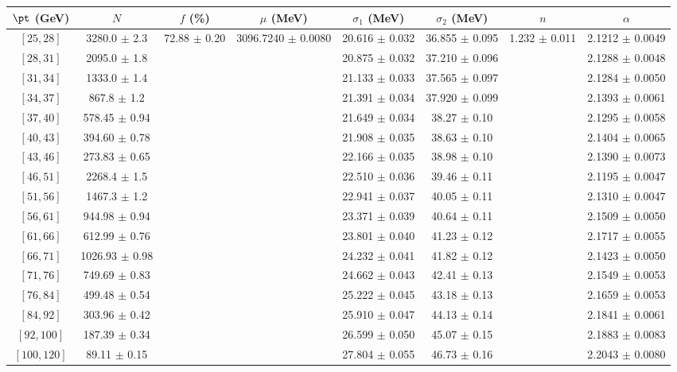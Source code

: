 \begin{tabular}{c||c|c|c|c|c|c|c}
$\pt$ (GeV) & $N$ & $f$ (\%) & $\mu$ (MeV) & $\sigma_1$ (MeV) & $\sigma_2$ (MeV) & $n$ & $\alpha$ \\
\hline
$[25, 28]$ & 3280.0 $\pm$ 2.3 & \multirow{17}{*}{72.88 $\pm$ 0.20} & \multirow{17}{*}{3096.7240 $\pm$ 0.0080} & 20.616 $\pm$ 0.032 & 36.855 $\pm$ 0.095 & \multirow{17}{*}{1.232 $\pm$ 0.011} & 2.1212 $\pm$ 0.0049\\
$[28, 31]$ & 2095.0 $\pm$ 1.8 &  &  & 20.875 $\pm$ 0.032 & 37.210 $\pm$ 0.096 &  & 2.1288 $\pm$ 0.0048\\
$[31, 34]$ & 1333.0 $\pm$ 1.4 &  &  & 21.133 $\pm$ 0.033 & 37.565 $\pm$ 0.097 &  & 2.1284 $\pm$ 0.0050\\
$[34, 37]$ & 867.8 $\pm$ 1.2 &  &  & 21.391 $\pm$ 0.034 & 37.920 $\pm$ 0.099 &  & 2.1393 $\pm$ 0.0061\\
$[37, 40]$ & 578.45 $\pm$ 0.94 &  &  & 21.649 $\pm$ 0.034 & 38.27 $\pm$ 0.10 &  & 2.1295 $\pm$ 0.0058\\
$[40, 43]$ & 394.60 $\pm$ 0.78 &  &  & 21.908 $\pm$ 0.035 & 38.63 $\pm$ 0.10 &  & 2.1404 $\pm$ 0.0065\\
$[43, 46]$ & 273.83 $\pm$ 0.65 &  &  & 22.166 $\pm$ 0.035 & 38.98 $\pm$ 0.10 &  & 2.1390 $\pm$ 0.0073\\
$[46, 51]$ & 2268.4 $\pm$ 1.5 &  &  & 22.510 $\pm$ 0.036 & 39.46 $\pm$ 0.11 &  & 2.1195 $\pm$ 0.0047\\
$[51, 56]$ & 1467.3 $\pm$ 1.2 &  &  & 22.941 $\pm$ 0.037 & 40.05 $\pm$ 0.11 &  & 2.1310 $\pm$ 0.0047\\
$[56, 61]$ & 944.98 $\pm$ 0.94 &  &  & 23.371 $\pm$ 0.039 & 40.64 $\pm$ 0.11 &  & 2.1509 $\pm$ 0.0050\\
$[61, 66]$ & 612.99 $\pm$ 0.76 &  &  & 23.801 $\pm$ 0.040 & 41.23 $\pm$ 0.12 &  & 2.1717 $\pm$ 0.0055\\
$[66, 71]$ & 1026.93 $\pm$ 0.98 &  &  & 24.232 $\pm$ 0.041 & 41.82 $\pm$ 0.12 &  & 2.1423 $\pm$ 0.0050\\
$[71, 76]$ & 749.69 $\pm$ 0.83 &  &  & 24.662 $\pm$ 0.043 & 42.41 $\pm$ 0.13 &  & 2.1549 $\pm$ 0.0053\\
$[76, 84]$ & 499.48 $\pm$ 0.54 &  &  & 25.222 $\pm$ 0.045 & 43.18 $\pm$ 0.13 &  & 2.1659 $\pm$ 0.0053\\
$[84, 92]$ & 303.96 $\pm$ 0.42 &  &  & 25.910 $\pm$ 0.047 & 44.13 $\pm$ 0.14 &  & 2.1841 $\pm$ 0.0061\\
$[92, 100]$ & 187.39 $\pm$ 0.34 &  &  & 26.599 $\pm$ 0.050 & 45.07 $\pm$ 0.15 &  & 2.1883 $\pm$ 0.0083\\
$[100, 120]$ & 89.11 $\pm$ 0.15 &  &  & 27.804 $\pm$ 0.055 & 46.73 $\pm$ 0.16 &  & 2.2043 $\pm$ 0.0080\\
\end{tabular}
